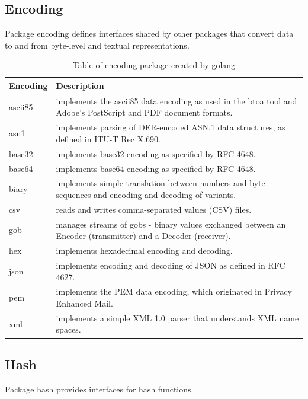\documentclass[
  digital, %
  notable,   %
  lof,     %
  lot,     %
]{fithesis3}
\begin{document}
\subsection{Encoding}
Package encoding defines interfaces shared by other packages that convert data to and from 
byte-level and textual representations.

\begin{table}[th]
\begin{tabular}{|p{1.5cm} p{10.5cm}|}
\hline
Encoding & Description \\
\hline
ascii85 & implements the ascii85 data encoding as used in the btoa tool and Adobe's PostScript and PDF document formats. \\
asn1 & implements parsing of DER-encoded ASN.1 data structures, as defined in ITU-T Rec X.690. \\
base32 & implements base32 encoding as specified by RFC 4648. \\
base64 & implements base64 encoding as specified by RFC 4648. \\
biary & implements simple translation between numbers and byte sequences and encoding and decoding of variants. \\
csv & reads and writes comma-separated values (CSV) files. \\
gob & manages streams of gobs - binary values exchanged between an Encoder (transmitter) and a Decoder (receiver). \\
hex & implements hexadecimal encoding and decoding. \\
json & implements encoding and decoding of JSON as defined in RFC 4627. \\
pem & implements the PEM data encoding, which originated in Privacy Enhanced Mail. \\
xml & implements a simple XML 1.0 parser that understands XML name spaces. \\
\hline
\end{tabular}
\caption{Table of encoding package created by golang} 
\label{table:encoding} 
\end{table}

\subsection{Hash}
Package hash provides interfaces for hash functions.
\end{document}
